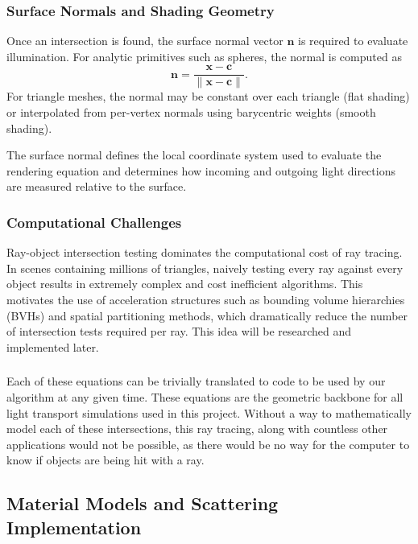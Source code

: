 \documentclass[11pt]{article}
\begin{document}
\subsubsection{Surface Normals and Shading Geometry}

Once an intersection is found, the surface normal vector $\mathbf{n}$ is required to evaluate illumination. For analytic primitives such as spheres, the normal is computed as
\begin{equation}
\mathbf{n} = \frac{\mathbf{x} - \mathbf{c}}{\|\mathbf{x} - \mathbf{c}\|}.
\end{equation}
For triangle meshes, the normal may be constant over each triangle (flat shading) or interpolated from per-vertex normals using barycentric weights (smooth shading).

The surface normal defines the local coordinate system used to evaluate the rendering equation and determines how incoming and outgoing light directions are measured relative to the surface.


\subsubsection{Computational Challenges}

Ray-object intersection testing dominates the computational cost of ray tracing. In scenes containing millions of triangles, naively testing every ray against every object results in extremely complex and cost inefficient algorithms. This motivates the use of acceleration structures such as bounding volume hierarchies (BVHs) and spatial partitioning methods, which dramatically reduce the number of intersection tests required per ray. This idea will be researched and implemented later.

\subsubsection{}

Each of these equations can be trivially translated to code to be used by our algorithm at any given time. These equations are  the geometric backbone for all light transport simulations used in this project. Without a way to mathematically model each of these intersections, this ray tracing, along with countless other applications would not be possible, as there would be no way for the computer to know if objects are being hit with a ray.  



\subsection{Material Models and Scattering Implementation}
\end{document}
